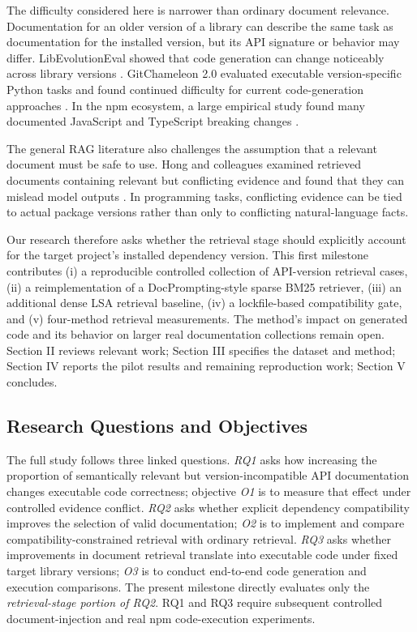 \documentclass[conference]{IEEEtran}
\begin{document}
The difficulty considered here is narrower than ordinary document relevance. Documentation for an older version of a library can describe the same task as documentation for the installed version, but its API signature or behavior may differ. LibEvolutionEval showed that code generation can change noticeably across library versions \cite{libevolution}. GitChameleon 2.0 evaluated executable version-specific Python tasks and found continued difficulty for current code-generation approaches \cite{gitchameleon}. In the npm ecosystem, a large empirical study found many documented JavaScript and TypeScript breaking changes \cite{npmchanges}.

The general RAG literature also challenges the assumption that a relevant document must be safe to use. Hong and colleagues examined retrieved documents containing relevant but conflicting evidence and found that they can mislead model outputs \cite{gullible}. In programming tasks, conflicting evidence can be tied to actual package versions rather than only to conflicting natural-language facts.

Our research therefore asks whether the retrieval stage should explicitly account for the target project's installed dependency version. This first milestone contributes (i) a reproducible controlled collection of API-version retrieval cases, (ii) a reimplementation of a DocPrompting-style sparse BM25 retriever, (iii) an additional dense LSA retrieval baseline, (iv) a lockfile-based compatibility gate, and (v) four-method retrieval measurements. The method's impact on generated code and its behavior on larger real documentation collections remain open. Section II reviews relevant work; Section III specifies the dataset and method; Section IV reports the pilot results and remaining reproduction work; Section V concludes.

\subsection{Research Questions and Objectives}
The full study follows three linked questions. \textit{RQ1} asks how increasing the proportion of semantically relevant but version-incompatible API documentation changes executable code correctness; objective \textit{O1} is to measure that effect under controlled evidence conflict. \textit{RQ2} asks whether explicit dependency compatibility improves the selection of valid documentation; \textit{O2} is to implement and compare compatibility-constrained retrieval with ordinary retrieval. \textit{RQ3} asks whether improvements in document retrieval translate into executable code under fixed target library versions; \textit{O3} is to conduct end-to-end code generation and execution comparisons. The present milestone directly evaluates only the \emph{retrieval-stage portion of RQ2}. RQ1 and RQ3 require subsequent controlled document-injection and real npm code-execution experiments.
\end{document}
